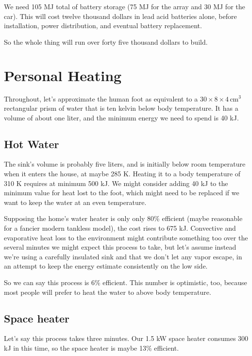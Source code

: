 \documentclass[12pt]{article}
\begin{document}
We need 105 MJ total of battery storage (75 MJ for the array and 30 MJ for the car). This will cost twelve thousand dollars in lead acid batteries alone, before installation, power distribution, and eventual battery replacement.

So the whole thing will run over forty five thousand dollars to build.


\section{Personal Heating}

Throughout, let's approximate the human foot as equivalent to a \(30 \times 8 \times 4\, \mathrm{cm}^3\) rectangular prism of water that is ten kelvin below body temperature. It has a volume of about one liter, and the minimum energy we need to spend is 40 kJ.

\subsection{Hot Water}

The sink's volume is probably five liters, and is initially below room temperature when it enters the house, at maybe 285 K. Heating it to a body temperature of 310 K requires at minimum 500 kJ. We might consider adding 40 kJ to the minimum value for heat lost to the foot, which might need to be replaced if we want to keep the water at an even temperature.

Supposing the home's water heater is only only 80\% efficient (maybe reasonable for a fancier modern tankless model), the cost rises to 675 kJ. Convective and evaporative heat loss to the environment might contribute something too over the several minutes we might expect this process to take, but let's assume instead we're using a carefully insulated sink and that we don't let any vapor escape, in an attempt to keep the energy estimate consistently on the low side.

So we can say this process is 6\% efficient. This number is optimistic, too, because most people will prefer to heat the water to above body temperature.

\subsection{Space heater}

Let's say this process takes three minutes. Our 1.5 kW space heater consumes 300 kJ in this time, so the space heater is maybe 13\% efficient.
\end{document}
